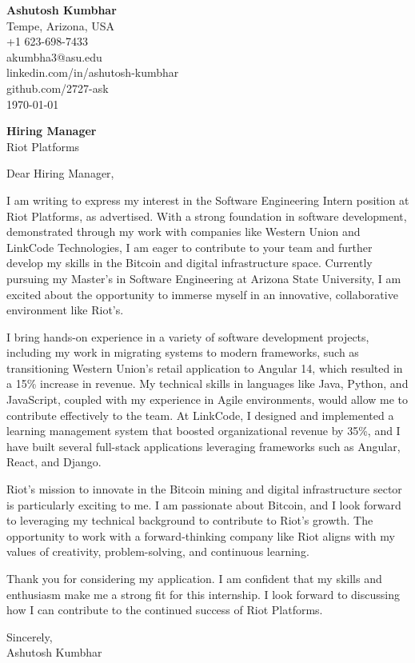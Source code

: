 \documentclass[11pt]{article}
\begin{document}
\begin{flushleft}
\textbf{Ashutosh Kumbhar} \\
Tempe, Arizona, USA \\
+1 623-698-7433 \\
akumbha3@asu.edu \\
linkedin.com/in/ashutosh-kumbhar \\
github.com/2727-ask \\
\today
\end{flushleft}

\vspace{0.5em}
\textbf{Hiring Manager} \\
Riot Platforms \\

\vspace{1em}

Dear Hiring Manager,

I am writing to express my interest in the Software Engineering Intern position at Riot Platforms, as advertised. With a strong foundation in software development, demonstrated through my work with companies like Western Union and LinkCode Technologies, I am eager to contribute to your team and further develop my skills in the Bitcoin and digital infrastructure space. Currently pursuing my Master’s in Software Engineering at Arizona State University, I am excited about the opportunity to immerse myself in an innovative, collaborative environment like Riot's.

I bring hands-on experience in a variety of software development projects, including my work in migrating systems to modern frameworks, such as transitioning Western Union’s retail application to Angular 14, which resulted in a 15\% increase in revenue. My technical skills in languages like Java, Python, and JavaScript, coupled with my experience in Agile environments, would allow me to contribute effectively to the team. At LinkCode, I designed and implemented a learning management system that boosted organizational revenue by 35\%, and I have built several full-stack applications leveraging frameworks such as Angular, React, and Django.

Riot’s mission to innovate in the Bitcoin mining and digital infrastructure sector is particularly exciting to me. I am passionate about Bitcoin, and I look forward to leveraging my technical background to contribute to Riot’s growth. The opportunity to work with a forward-thinking company like Riot aligns with my values of creativity, problem-solving, and continuous learning.

Thank you for considering my application. I am confident that my skills and enthusiasm make me a strong fit for this internship. I look forward to discussing how I can contribute to the continued success of Riot Platforms.

Sincerely, \\
Ashutosh Kumbhar
\end{document}
